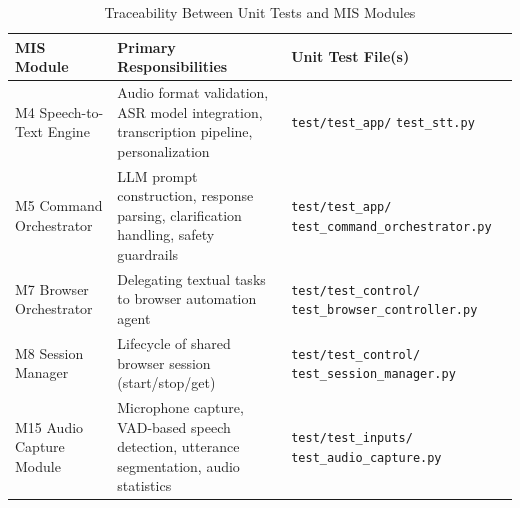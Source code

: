 \documentclass[12pt, titlepage]{article}
\begin{document}
\begin{table}[H]
\centering
\caption{Traceability Between Unit Tests and MIS Modules}
\label{tab:unit-traceability}
\renewcommand{\arraystretch}{1.2}
\begin{tabular}{|p{3.5cm}|p{5.5cm}|p{6cm}|}
\hline
\textbf{MIS Module} & \textbf{Primary Responsibilities} & \textbf{Unit Test File(s)} \\
\hline
M4 Speech-to-Text Engine & Audio format validation, ASR model integration, transcription pipeline, personalization & \texttt{test/test\_app/} \texttt{test\_stt.py} \\
\hline
M5 Command Orchestrator & LLM prompt construction, response parsing, clarification handling, safety guardrails & \texttt{test/test\_app/} \texttt{test\_command\_orchestrator.py} \\
\hline
M7 Browser Orchestrator & Delegating textual tasks to browser automation agent & \texttt{test/test\_control/} \texttt{test\_browser\_controller.py} \\
\hline
M8 Session Manager & Lifecycle of shared browser session (start/stop/get) & \texttt{test/test\_control/} \texttt{test\_session\_manager.py} \\
\hline
M15 Audio Capture Module & Microphone capture, VAD-based speech detection, utterance segmentation, audio statistics & \texttt{test/test\_inputs/} \texttt{test\_audio\_capture.py} \\
\hline
\end{tabular}
\end{table}




		
\end{document}
